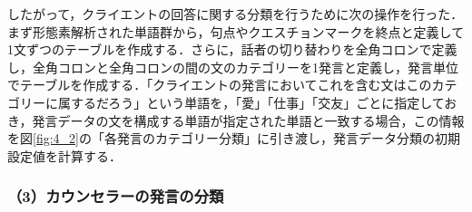 \documentclass[shuuron]{kuee}
\begin{document}


したがって，クライエントの回答に関する分類を行うために次の操作を行った．まず形態素解析された単語群から，句点やクエスチョンマークを終点と定義して1文ずつのテーブルを作成する．さらに，話者の切り替わりを全角コロンで定義し，全角コロンと全角コロンの間の文のカテゴリーを1発言と定義し，発言単位でテーブルを作成する．「クライエントの発言においてこれを含む文はこのカテゴリーに属するだろう」という単語を，「愛」「仕事」「交友」ごとに指定しておき，発言データの文を構成する単語が指定された単語と一致する場合，この情報を図\ref{fig:4_2}の「各発言のカテゴリー分類」に引き渡し，発言データ分類の初期設定値を計算する．


\subsubsection{（3）カウンセラーの発言の分類}
\end{document}
